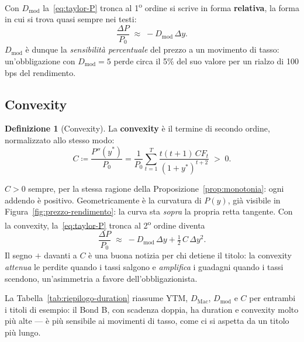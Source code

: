 \documentclass[11pt,a4paper]{article}
\theoremstyle{plain}
\theoremstyle{definition}
\newtheorem{definizione}[teorema]{Definizione}
\theoremstyle{remark}
\newcommand{\YTM}{\mathrm{YTM}}
\newcommand{\defeq}{\coloneqq}
\begin{document}
Con $D_{\mathrm{mod}}$ la~\eqref{eq:taylor-P} tronca al 1\textsuperscript{o} ordine si scrive
in forma \textbf{relativa}, la forma in cui si trova quasi sempre nei testi:
\begin{equation}
  \frac{\Delta P}{P_0} \;\approx\; -D_{\mathrm{mod}}\,\Delta y.
  \label{eq:taylor-lineare}
\end{equation}
$D_{\mathrm{mod}}$ è dunque la \emph{sensibilità percentuale} del prezzo a un movimento di
tasso: un'obbligazione con $D_{\mathrm{mod}}=5$ perde circa il 5\% del suo valore per un rialzo
di 100 bps del rendimento.

\subsection{Convexity}
\label{sec:convexity}

\begin{definizione}[Convexity]
\label{def:convexity}
La \textbf{convexity} è il termine di secondo ordine, normalizzato allo stesso modo:
\begin{equation}
  C \defeq \frac{P''(y^\ast)}{P_0}
  = \frac{1}{P_0}\sum_{t=1}^{T} \frac{t(t+1)\,CF_t}{(1+y^\ast)^{t+2}} \;>\;0.
  \label{eq:convexity-def}
\end{equation}
\end{definizione}
$C>0$ sempre, per la stessa ragione della Proposizione~\ref{prop:monotonia}: ogni addendo è
positivo. Geometricamente è la curvatura di $P(y)$, già visibile in
Figura~\ref{fig:prezzo-rendimento}: la curva sta \emph{sopra} la propria retta tangente. Con la
convexity, la~\eqref{eq:taylor-P} tronca al 2\textsuperscript{o} ordine diventa
\begin{equation}
  \frac{\Delta P}{P_0} \;\approx\; -D_{\mathrm{mod}}\,\Delta y + \tfrac12\,C\,\Delta y^2.
  \label{eq:taylor-quadratica}
\end{equation}
Il segno $+$ davanti a $C$ è una buona notizia per chi detiene il titolo: la convexity
\emph{attenua} le perdite quando i tassi salgono e \emph{amplifica} i guadagni quando i tassi
scendono, un'asimmetria a favore dell'obbligazionista.

La Tabella~\ref{tab:riepilogo-duration} riassume $\YTM$, $D_{\mathrm{Mac}}$, $D_{\mathrm{mod}}$
e $C$ per entrambi i titoli di esempio: il Bond B, con scadenza doppia, ha duration e
convexity molto più alte --- è più sensibile ai movimenti di tasso, come ci si aspetta da un
titolo più lungo.


\end{document}
